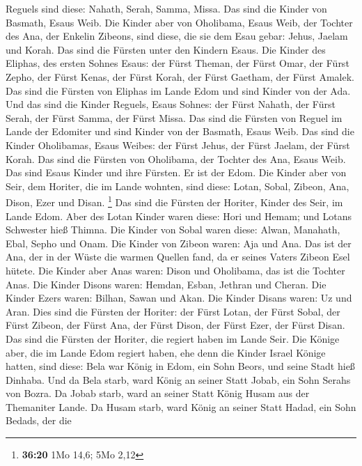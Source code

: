 Reguels sind diese: Nahath, Serah, Samma, Missa. Das sind die Kinder von
Basmath, Esaus Weib.  Die Kinder aber von Oholibama, Esaus
Weib, der Tochter des Ana, der Enkelin Zibeons, sind diese, die sie dem
Esau gebar: Jehus, Jaelam und Korah.  Das sind die Fürsten
unter den Kindern Esaus. Die Kinder des Eliphas, des ersten Sohnes
Esaus: der Fürst Theman, der Fürst Omar, der Fürst Zepho, der Fürst
Kenas,  der Fürst Korah, der Fürst Gaetham, der Fürst
Amalek. Das sind die Fürsten von Eliphas im Lande Edom und sind Kinder
von der Ada.  Und das sind die Kinder Reguels, Esaus
Sohnes: der Fürst Nahath, der Fürst Serah, der Fürst Samma, der Fürst
Missa. Das sind die Fürsten von Reguel im Lande der Edomiter und sind
Kinder von der Basmath, Esaus Weib.  Das sind die Kinder
Oholibamas, Esaus Weibes: der Fürst Jehus, der Fürst Jaelam, der Fürst
Korah. Das sind die Fürsten von Oholibama, der Tochter des Ana, Esaus
Weib.  Das sind Esaus Kinder und ihre Fürsten. Er ist der
Edom.  Die Kinder aber von Seir, dem Horiter, die im Lande
wohnten, sind diese: Lotan, Sobal, Zibeon, Ana, Dison, Ezer und Disan.
\footnote{\textbf{36:20} 1Mo 14,6; 5Mo 2,12}  Das sind die
Fürsten der Horiter, Kinder des Seir, im Lande Edom.  Aber
des Lotan Kinder waren diese: Hori und Hemam; und Lotans Schwester hieß
Thimna.  Die Kinder von Sobal waren diese: Alwan, Manahath,
Ebal, Sepho und Onam.  Die Kinder von Zibeon waren: Aja und
Ana. Das ist der Ana, der in der Wüste die warmen Quellen fand, da er
seines Vaters Zibeon Esel hütete.  Die Kinder aber Anas
waren: Dison und Oholibama, das ist die Tochter Anas.  Die
Kinder Disons waren: Hemdan, Esban, Jethran und Cheran. 
Die Kinder Ezers waren: Bilhan, Sawan und Akan.  Die Kinder
Disans waren: Uz und Aran.  Dies sind die Fürsten der
Horiter: der Fürst Lotan, der Fürst Sobal, der Fürst Zibeon, der Fürst
Ana,  der Fürst Dison, der Fürst Ezer, der Fürst Disan. Das
sind die Fürsten der Horiter, die regiert haben im Lande Seir.
 Die Könige aber, die im Lande Edom regiert haben, ehe denn
die Kinder Israel Könige hatten, sind diese:  Bela war
König in Edom, ein Sohn Beors, und seine Stadt hieß Dinhaba.
 Und da Bela starb, ward König an seiner Statt Jobab, ein
Sohn Serahs von Bozra.  Da Jobab starb, ward an seiner
Statt König Husam aus der Themaniter Lande.  Da Husam
starb, ward König an seiner Statt Hadad, ein Sohn Bedads, der die
